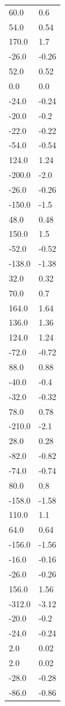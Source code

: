 \begin{longtable}{ll}
60.0 & 0.6 \\
54.0 & 0.54 \\
170.0 & 1.7 \\
-26.0 & -0.26 \\
52.0 & 0.52 \\
0.0 & 0.0 \\
-24.0 & -0.24 \\
-20.0 & -0.2 \\
-22.0 & -0.22 \\
-54.0 & -0.54 \\
124.0 & 1.24 \\
-200.0 & -2.0 \\
-26.0 & -0.26 \\
-150.0 & -1.5 \\
48.0 & 0.48 \\
150.0 & 1.5 \\
-52.0 & -0.52 \\
-138.0 & -1.38 \\
32.0 & 0.32 \\
70.0 & 0.7 \\
164.0 & 1.64 \\
136.0 & 1.36 \\
124.0 & 1.24 \\
-72.0 & -0.72 \\
88.0 & 0.88 \\
-40.0 & -0.4 \\
-32.0 & -0.32 \\
78.0 & 0.78 \\
-210.0 & -2.1 \\
28.0 & 0.28 \\
-82.0 & -0.82 \\
-74.0 & -0.74 \\
80.0 & 0.8 \\
-158.0 & -1.58 \\
110.0 & 1.1 \\
64.0 & 0.64 \\
-156.0 & -1.56 \\
-16.0 & -0.16 \\
-26.0 & -0.26 \\
156.0 & 1.56 \\
-312.0 & -3.12 \\
-20.0 & -0.2 \\
-24.0 & -0.24 \\
2.0 & 0.02 \\
2.0 & 0.02 \\
-28.0 & -0.28 \\
-86.0 & -0.86 \\

\end{longtable}
